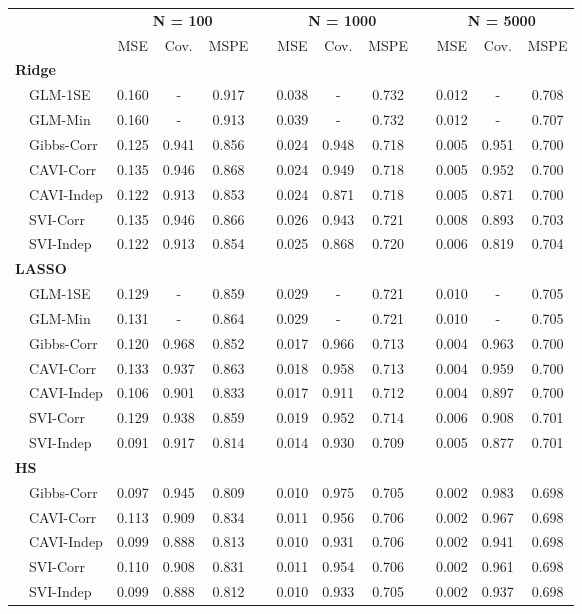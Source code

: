 \begin{center}
\begin{tabular}{lccccccccccc}
\hline\hline
\multicolumn{1}{l}{\bfseries }&\multicolumn{3}{c}{\bfseries N = 100}&\multicolumn{1}{c}{\bfseries }&\multicolumn{3}{c}{\bfseries N = 1000}&\multicolumn{1}{c}{\bfseries }&\multicolumn{3}{c}{\bfseries N = 5000}\tabularnewline
\cline{2-4} \cline{6-8} \cline{10-12}
\multicolumn{1}{l}{}&\multicolumn{1}{c}{MSE}&\multicolumn{1}{c}{Cov.}&\multicolumn{1}{c}{MSPE}&\multicolumn{1}{c}{}&\multicolumn{1}{c}{MSE}&\multicolumn{1}{c}{Cov.}&\multicolumn{1}{c}{MSPE}&\multicolumn{1}{c}{}&\multicolumn{1}{c}{MSE}&\multicolumn{1}{c}{Cov.}&\multicolumn{1}{c}{MSPE}\tabularnewline
\hline
{\bfseries Ridge}&&&&&&&&&&&\tabularnewline
~~GLM-1SE&0.160&-&0.917&&0.038&-&0.732&&0.012&-&0.708\tabularnewline
~~GLM-Min&0.160&-&0.913&&0.039&-&0.732&&0.012&-&0.707\tabularnewline
~~Gibbs-Corr&0.125&0.941&0.856&&0.024&0.948&0.718&&0.005&0.951&0.700\tabularnewline
~~CAVI-Corr&0.135&0.946&0.868&&0.024&0.949&0.718&&0.005&0.952&0.700\tabularnewline
~~CAVI-Indep&0.122&0.913&0.853&&0.024&0.871&0.718&&0.005&0.871&0.700\tabularnewline
~~SVI-Corr&0.135&0.946&0.866&&0.026&0.943&0.721&&0.008&0.893&0.703\tabularnewline
~~SVI-Indep&0.122&0.913&0.854&&0.025&0.868&0.720&&0.006&0.819&0.704\tabularnewline
\hline
{\bfseries LASSO}&&&&&&&&&&&\tabularnewline
~~GLM-1SE&0.129&-&0.859&&0.029&-&0.721&&0.010&-&0.705\tabularnewline
~~GLM-Min&0.131&-&0.864&&0.029&-&0.721&&0.010&-&0.705\tabularnewline
~~Gibbs-Corr&0.120&0.968&0.852&&0.017&0.966&0.713&&0.004&0.963&0.700\tabularnewline
~~CAVI-Corr&0.133&0.937&0.863&&0.018&0.958&0.713&&0.004&0.959&0.700\tabularnewline
~~CAVI-Indep&0.106&0.901&0.833&&0.017&0.911&0.712&&0.004&0.897&0.700\tabularnewline
~~SVI-Corr&0.129&0.938&0.859&&0.019&0.952&0.714&&0.006&0.908&0.701\tabularnewline
~~SVI-Indep&0.091&0.917&0.814&&0.014&0.930&0.709&&0.005&0.877&0.701\tabularnewline
\hline
{\bfseries HS}&&&&&&&&&&&\tabularnewline
~~Gibbs-Corr&0.097&0.945&0.809&&0.010&0.975&0.705&&0.002&0.983&0.698\tabularnewline
~~CAVI-Corr&0.113&0.909&0.834&&0.011&0.956&0.706&&0.002&0.967&0.698\tabularnewline
~~CAVI-Indep&0.099&0.888&0.813&&0.010&0.931&0.706&&0.002&0.941&0.698\tabularnewline
~~SVI-Corr&0.110&0.908&0.831&&0.011&0.954&0.706&&0.002&0.961&0.698\tabularnewline
~~SVI-Indep&0.099&0.888&0.812&&0.010&0.933&0.705&&0.002&0.937&0.698\tabularnewline
\hline
\end{tabular}\end{center}
